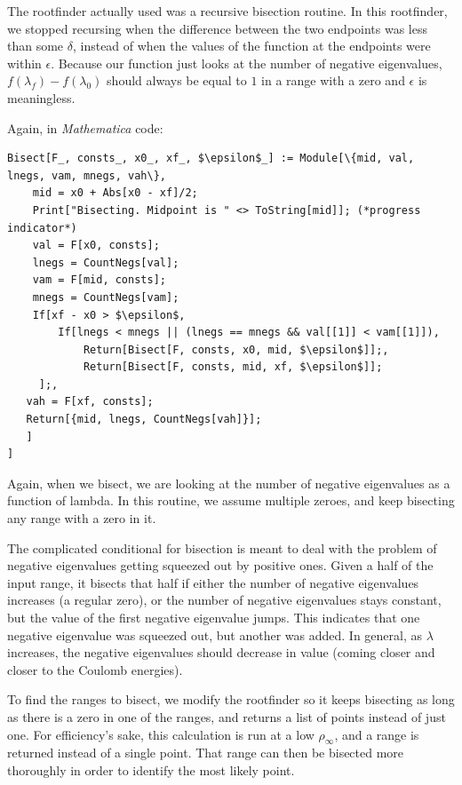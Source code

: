 \documentclass[12pt,twoside]{reedthesis}
\begin{document}
The rootfinder actually used was a recursive bisection routine. In this rootfinder, we stopped recursing when the difference between the two endpoints was less than some $\delta$, instead of when the values of the function at the endpoints were within $\epsilon$. Because our function just looks at the number of negative eigenvalues, $f(\lambda_f) - f(\lambda_0)$ should always be equal to $1$ in a range with a zero and $\epsilon$ is meaningless. 

Again, in \emph{Mathematica} code:

\begin{Verbatim}[commandchars=\\\{\}, codes={\catcode`$=3}]
Bisect[F_, consts_, x0_, xf_, $\epsilon$_] := Module[\{mid, val, lnegs, vam, mnegs, vah\},
    mid = x0 + Abs[x0 - xf]/2;
    Print["Bisecting. Midpoint is " <> ToString[mid]]; (*progress indicator*)
    val = F[x0, consts];
    lnegs = CountNegs[val];
    vam = F[mid, consts];
    mnegs = CountNegs[vam];
    If[xf - x0 > $\epsilon$,
        If[lnegs < mnegs || (lnegs == mnegs && val[[1]] < vam[[1]]), 
            Return[Bisect[F, consts, x0, mid, $\epsilon$]];, 
            Return[Bisect[F, consts, mid, xf, $\epsilon$]]; 
     ];,
   vah = F[xf, consts];
   Return[{mid, lnegs, CountNegs[vah]}];
   ]
]
\end{Verbatim}

Again, when we bisect, we are looking at the number of negative eigenvalues as a function of lambda. In this routine, we assume multiple zeroes, and keep bisecting any range with a zero in it.

The complicated conditional for bisection is meant to deal with the problem of negative eigenvalues getting squeezed out by positive ones. Given a half of the input range, it bisects that half if either the number of negative eigenvalues increases (a regular zero), or the number of negative eigenvalues stays constant, but the value of the first negative eigenvalue jumps. This indicates that one negative eigenvalue was squeezed out, but another was added. In general, as $\lambda$ increases, the negative eigenvalues should decrease in value (coming closer and closer to the Coulomb energies). 

To find the ranges to bisect, we modify the rootfinder so it keeps bisecting as long as there is a zero in one of the ranges, and returns a list of points instead of just one. For efficiency's sake, this calculation is run at a low $\rho_{\infty}$, and a range is returned instead of a single point. That range can then be bisected more thoroughly in order to identify the most likely point. 
\end{document}
